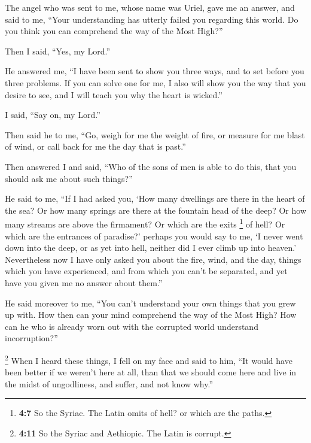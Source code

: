  The angel who was sent to me, whose name was Uriel, gave
me an answer,  and said to me, ``Your understanding has
utterly failed you regarding this world. Do you think you can comprehend
the way of the Most High?''

 Then I said, ``Yes, my Lord.''

He answered me, ``I have been sent to show you three ways, and to set
before you three problems.  If you can solve one for me, I
also will show you the way that you desire to see, and I will teach you
why the heart is wicked.''

 I said, ``Say on, my Lord.''

Then said he to me, ``Go, weigh for me the weight of fire, or measure
for me blast of wind, or call back for me the day that is past.''

 Then answered I and said, ``Who of the sons of men is
able to do this, that you should ask me about such things?''

 He said to me, ``If I had asked you, `How many dwellings
are there in the heart of the sea? Or how many springs are there at the
fountain head of the deep? Or how many streams are above the firmament?
Or which are the exits \footnote{\textbf{4:7} So the Syriac. The Latin
  omits of hell? or which are the paths.} of hell? Or which are the
entrances of paradise?'  perhaps you would say to me, `I
never went down into the deep, or as yet into hell, neither did I ever
climb up into heaven.'  Nevertheless now I have only asked
you about the fire, wind, and the day, things which you have
experienced, and from which you can't be separated, and yet have you
given me no answer about them.''

 He said moreover to me, ``You can't understand your own
things that you grew up with.  How then can your mind
comprehend the way of the Most High? How can he who is already worn out
with the corrupted world understand incorruption?''

\footnote{\textbf{4:11} So the Syriac and Aethiopic. The Latin is
  corrupt.} When I heard these things, I fell on my face 
and said to him, ``It would have been better if we weren't here at all,
than that we should come here and live in the midst of ungodliness, and
suffer, and not know why.''

